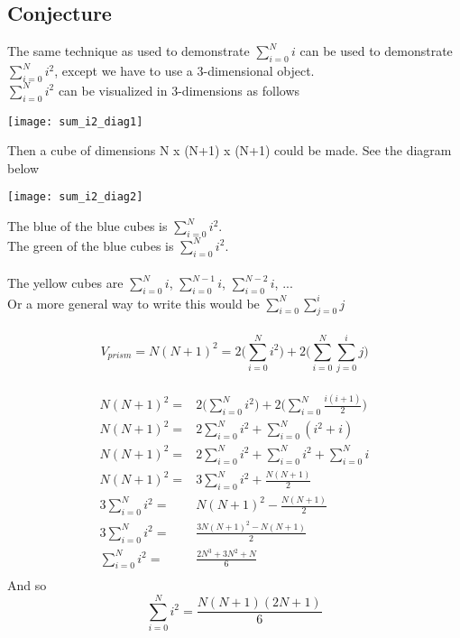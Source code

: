 \documentclass[11pt]{book}
\begin{document}
\subsection{Conjecture}
The same technique as used to demonstrate \(\sum\limits_{i=0}^N{i}\) can be used to demonstrate \(\sum\limits_{i=0}^N{i^2}\), except we have to use a 3-dimensional object.\\
\(\sum\limits_{i=0}^N{i^2}\) can be visualized in 3-dimensions as follows
\begin{center}
\texttt{[image: sum\_i2\_diag1]}
\end{center}
Then a cube of dimensions N x (N+1) x (N+1) could be made.  See the diagram below\\
\begin{center}
\texttt{[image: sum\_i2\_diag2]}
\end{center}
The blue of the blue cubes is \(\sum\limits_{i=0}^N{i^2}\).  \\
The green of the blue cubes is \(\sum\limits_{i=0}^N{i^2}\).  \\
\\
The yellow cubes are \(\sum\limits_{i=0}^N{i}\), \(\sum\limits_{i=0}^{N-1}{i}\), \(\sum\limits_{i=0}^{N-2}{i}\), ...   \\
Or a more general way to write this would be \(\sum\limits_{i=0}^N{ \sum\limits_{j=0}^i{j}}\) \\
\\
\[ V_{prism} = N(N+1)^2 = 2\bigg(\sum\limits_{i=0}^N{i^2}\bigg) + 2\bigg(\sum\limits_{i=0}^N{ \sum\limits_{j=0}^i{j}} \bigg) \] \\
\begin{align*}
N(N+1)^2 =& 2\bigg(\sum\limits_{i=0}^N{i^2}\bigg) + 2\bigg(\sum\limits_{i=0}^N{ \frac{i(i+1)}{2}} \bigg) \\
N(N+1)^2 =& 2\sum\limits_{i=0}^N{i^2} + \sum\limits_{i=0}^N{ (i^2 + i)} \\
N(N+1)^2 =& 2\sum\limits_{i=0}^N{i^2} + \sum\limits_{i=0}^N{i^2 } + \sum\limits_{i=0}^N{i} \\
N(N+1)^2 =& 3\sum\limits_{i=0}^N{i^2} + \frac{N(N+1)}{2} \\
3\sum\limits_{i=0}^N{i^2} =& N(N+1)^2 - \frac{N(N+1)}{2} \\
3\sum\limits_{i=0}^N{i^2} =& \frac{3N(N+1)^2 - N(N+1)}{2} \\
\sum\limits_{i=0}^N{i^2} =& \frac{2N^3+3N^2+N}{6} \\
\end{align*}
And so
\[\sum\limits_{i=0}^N{i^2} = \frac{N(N+1)(2N+1)}{6}\] \\
\end{document}
